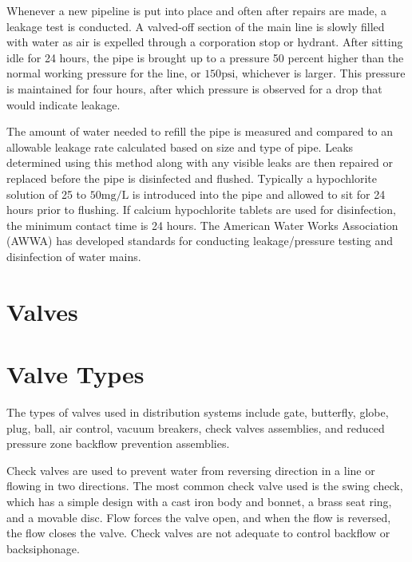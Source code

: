 \documentclass[10pt]{article}
\begin{document}
Whenever a new pipeline is put into place and often after repairs are made, a leakage test is conducted. A valved-off section of the main line is slowly filled with water as air is expelled through a corporation stop or hydrant. After sitting idle for 24 hours, the pipe is brought up to a pressure 50 percent higher than the normal working pressure for the line, or $150 \mathrm{psi}$, whichever is larger. This pressure is maintained for four hours, after which pressure is observed for a drop that would indicate leakage.

The amount of water needed to refill the pipe is measured and compared to an allowable leakage rate calculated based on size and type of pipe. Leaks determined using this method along with any visible leaks are then repaired or replaced before the pipe is disinfected and flushed. Typically a hypochlorite solution of 25 to $50 \mathrm{mg} / \mathrm{L}$ is introduced into the pipe and allowed to sit for 24 hours prior to flushing. If calcium hypochlorite tablets are used for disinfection, the minimum contact time is 24 hours. The American Water Works Association (AWWA) has developed standards for conducting leakage/pressure testing and disinfection of water mains.

\section{Valves}
\section{Valve Types}
The types of valves used in distribution systems include gate, butterfly, globe, plug, ball, air control, vacuum breakers, check valves assemblies, and reduced pressure zone backflow prevention assemblies.

Check valves are used to prevent water from reversing direction in a line or flowing in two directions. The most common check valve used is the swing check, which has a simple design with a cast iron body and bonnet, a brass seat ring, and a movable disc. Flow forces the valve open, and when the flow is reversed, the flow closes the valve. Check valves are not adequate to control backflow or backsiphonage.
\end{document}
